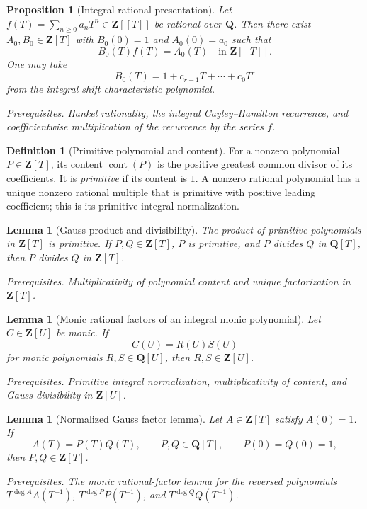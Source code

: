 \documentclass[10pt]{article}
\newtheorem{proposition}[theorem]{Proposition}
\newtheorem{lemma}[theorem]{Lemma}
\theoremstyle{definition}
\newtheorem{definition}[theorem]{Definition}
\newcommand{\deps}[1]{\par\smallskip\noindent\textit{Prerequisites.} #1}
\begin{document}
\begin{proposition}[Integral rational presentation]
Let \(f(T)=\sum_{n\geq0}a_nT^n\in\mathbf Z[[T]]\) be rational over
\(\mathbf Q\).  Then there exist \(A_0,B_0\in\mathbf Z[T]\) with
\(B_0(0)=1\) and \(A_0(0)=a_0\) such that
\[
 B_0(T)f(T)=A_0(T)
 \quad\text{in }\mathbf Z[[T]].
\]
One may take
\[
 B_0(T)=1+c_{r-1}T+\cdots+c_0T^r
\]
from the integral shift characteristic polynomial.
\deps{Hankel rationality, the integral Cayley--Hamilton recurrence, and
coefficientwise multiplication of the recurrence by the series \(f\).}
\end{proposition}

\begin{definition}[Primitive polynomial and content]
For a nonzero polynomial \(P\in\mathbf Z[T]\), its content
\(\operatorname{cont}(P)\) is the positive greatest common divisor of its
coefficients.  It is \emph{primitive} if its content is \(1\).  A nonzero
rational polynomial has a unique nonzero rational multiple that is primitive
with
positive leading coefficient; this is its primitive integral
normalization.
\end{definition}

\begin{lemma}[Gauss product and divisibility]
The product of primitive polynomials in \(\mathbf Z[T]\) is primitive.  If
\(P,Q\in\mathbf Z[T]\), \(P\) is primitive, and \(P\) divides \(Q\) in
\(\mathbf Q[T]\), then \(P\) divides \(Q\) in \(\mathbf Z[T]\).
\deps{Multiplicativity of polynomial content and unique factorization in
\(\mathbf Z[T]\).}
\end{lemma}

\begin{lemma}[Monic rational factors of an integral monic polynomial]
Let \(C\in\mathbf Z[U]\) be monic.  If
\[
 C(U)=R(U)S(U)
\]
for monic polynomials \(R,S\in\mathbf Q[U]\), then
\(R,S\in\mathbf Z[U]\).
\deps{Primitive integral normalization, multiplicativity of content, and
Gauss divisibility in \(\mathbf Z[U]\).}
\end{lemma}

\begin{lemma}[Normalized Gauss factor lemma]
Let \(A\in\mathbf Z[T]\) satisfy \(A(0)=1\).  If
\[
 A(T)=P(T)Q(T),\qquad P,Q\in\mathbf Q[T],
 \qquad P(0)=Q(0)=1,
\]
then \(P,Q\in\mathbf Z[T]\).
\deps{The monic rational-factor lemma for the reversed polynomials
\(T^{\deg A}A(T^{-1})\),
\(T^{\deg P}P(T^{-1})\), and
\(T^{\deg Q}Q(T^{-1})\).}
\end{lemma}
\end{document}
